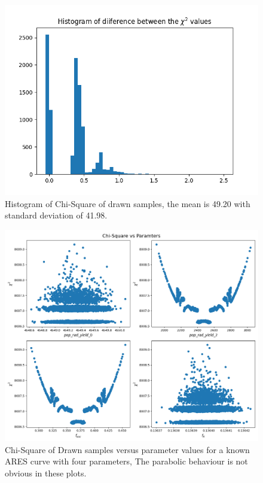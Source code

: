 \documentclass[12pt, TexShade, letterpaper]{report}
\begin{document}
\begin{figure}[h!]
\centering
\includegraphics[scale =0.7]{csq_hist_edges.png}
\caption[Histogram of Chi-Square of drawn samples]{Histogram of Chi-Square of drawn samples, the mean is 49.20 with standard deviation of 41.98.}
\label{fig:csq_hist_known_curve}
\end{figure}

\begin{figure}[h!]
\centering
\includegraphics[scale =0.5]{csq_vs_params_edges.png}
\caption[Chi-Square of Drawn samples vs parameter values]{Chi-Square of Drawn samples versus parameter values for a known ARES curve with four parameters, The parabolic behaviour is not obvious in these plots.}
\label{fig:csq_vs_params_knwon_curve}
\end{figure}
\end{document}
